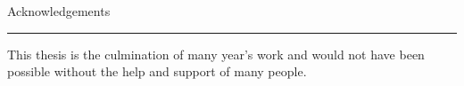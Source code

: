 \documentclass[../thesis-main.tex]{subfiles}
\begin{document}
 \vspace*{10mm}
 {
  \Large\em
  \begin{flushright}
   Acknowledgements
  \end{flushright}
  \rule{\linewidth}{0.25mm}
 }
 \label{sec:acknowledgements}
 
 This thesis is the culmination of many year's work and would not have been possible without the help and support of many people. 
 
 
 
 
\end{document}
